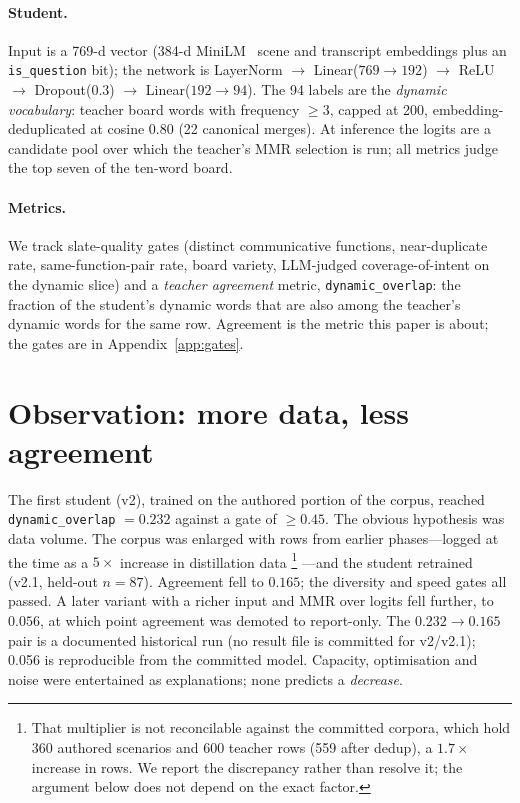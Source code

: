\paragraph{Student.} Input is a 769-d vector (384-d MiniLM~\citep{minilm}
scene and transcript embeddings plus an \texttt{is\_question} bit); the network
is LayerNorm $\to$ Linear($769{\to}192$) $\to$ ReLU $\to$ Dropout(0.3) $\to$
Linear($192{\to}94$). The 94 labels are the \emph{dynamic vocabulary}: teacher
board words with frequency $\ge3$, capped at 200, embedding-deduplicated at
cosine 0.80 (22 canonical merges). At inference the logits are a candidate
pool over which the teacher's MMR selection is run; all metrics judge the top
seven of the ten-word board.

\paragraph{Metrics.} We track slate-quality gates (distinct communicative
functions, near-duplicate rate, same-function-pair rate, board variety,
LLM-judged coverage-of-intent on the dynamic slice) and a \emph{teacher
agreement} metric, \texttt{dynamic\_overlap}: the fraction of the student's
dynamic words that are also among the teacher's dynamic words for the same
row. Agreement is the metric this paper is about; the gates are in
Appendix~\ref{app:gates}.

\section{Observation: more data, less agreement}
\label{sec:obs}
The first student (v2), trained on the authored portion of the corpus,
reached \texttt{dynamic\_overlap} $=0.232$ against a gate of $\ge 0.45$. The
obvious hypothesis was data volume. The corpus was enlarged with rows from
earlier phases---logged at the time as a $5\times$ increase in distillation
data%
\footnote{That multiplier is not reconcilable against the committed corpora,
which hold 360 authored scenarios and 600 teacher rows (559 after dedup), a
$1.7\times$ increase in rows. We report the discrepancy rather than resolve it;
the argument below does not depend on the exact factor.}%
---and the student retrained (v2.1, held-out $n=87$). Agreement fell to
$0.165$; the diversity and speed gates all passed. A later variant with a
richer input and MMR over logits fell further, to $0.056$, at which point
agreement was demoted to report-only. The $0.232\to0.165$ pair is a
documented historical run (no result file is committed for v2/v2.1); 0.056 is
reproducible from the committed model. Capacity, optimisation and noise were entertained as explanations; none
predicts a \emph{decrease}.

